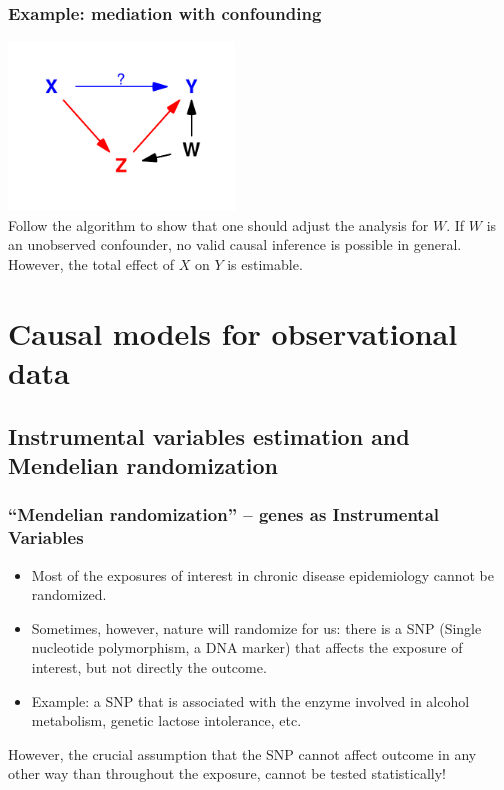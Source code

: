 \documentclass[xcolor=svgnames,handout]{beamer}
\begin{document}
\begin{frame}
\frametitle{Example: mediation with confounding}
\includegraphics[width=6cm]{mediation_conf}\\[-0.3cm]

Follow the algorithm to show that one should adjust the analysis for $W$. If $W$ is an unobserved confounder, no valid causal inference is possible in general. However, the total effect of $X$ on $Y$ is estimable.

\end{frame}

\section{Causal models for observational data}
\subsection{Instrumental variables estimation and Mendelian randomization}
\begin{frame}
  \frametitle{``Mendelian randomization'' -- genes as Instrumental Variables}
    \begin{itemize}
  \item \alert<1>{Most of the exposures of interest in chronic disease epidemiology cannot be randomized.}
  \item \alert<2>{Sometimes}, however, nature will randomize for us: \alert<2>{there is a SNP (Single nucleotide polymorphism, a DNA marker) that affects the exposure of interest, but not directly the outcome.} 
  \item Example: a SNP that is associated with the enzyme involved in alcohol metabolism, genetic lactose intolerance, etc. 
  \end{itemize}
However, the crucial assumption that the SNP cannot affect outcome in any other way than throughout the exposure, cannot be tested statistically!
\end{frame}
\end{document}
